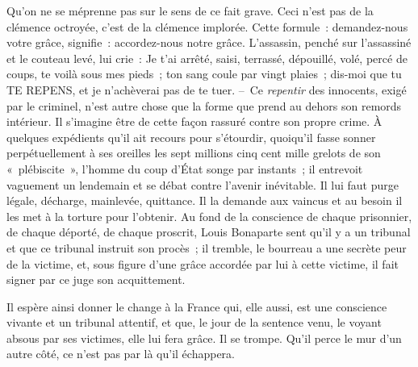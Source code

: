\documentclass[french,twoside]{book} %
\begin{document}
\noindent Qu’on ne se méprenne pas sur le sens de ce fait grave. Ceci n’est pas de la clémence octroyée, c’est de la clémence implorée. Cette formule : demandez-nous votre grâce, signifie : accordez-nous notre grâce. L’assassin, penché sur l’assassiné et le couteau levé, lui crie : Je t’ai arrêté, saisi, terrassé, dépouillé, volé, percé de coups, te voilà sous mes pieds ; ton sang coule par vingt plaies ; dis-moi que tu TE REPENS, et je n’achèverai pas de te tuer. – Ce \emph{repentir} des innocents, exigé par le criminel, n’est autre chose que la forme que prend au dehors son remords intérieur. Il s’imagine être de cette façon rassuré contre son propre crime. À quelques expédients qu’il ait recours pour s’étourdir, quoiqu’il fasse sonner perpétuellement à ses oreilles les sept millions cinq cent mille grelots de son « plébiscite », l’homme du coup d’État songe par instants ; il entrevoit vaguement un lendemain et se débat contre l’avenir inévitable. Il lui faut purge légale, décharge, mainlevée, quittance. Il la demande aux vaincus et au besoin il les met à la torture pour l’obtenir. Au fond de la conscience de chaque prisonnier, de chaque déporté, de chaque proscrit, Louis Bonaparte sent qu’il y a un tribunal et que ce tribunal instruit son procès ; il tremble, le bourreau a une secrète peur de la victime, et, sous figure d’une grâce accordée par lui à cette victime, il fait signer par ce juge son acquittement.\par
Il espère ainsi donner le change à la France qui, elle aussi, est une conscience vivante et un tribunal attentif, et que, le jour de la sentence venu, le voyant absous par ses victimes, elle lui fera grâce. Il se trompe. Qu’il perce le mur d’un autre côté, ce n’est pas par là qu’il échappera.
\end{document}
